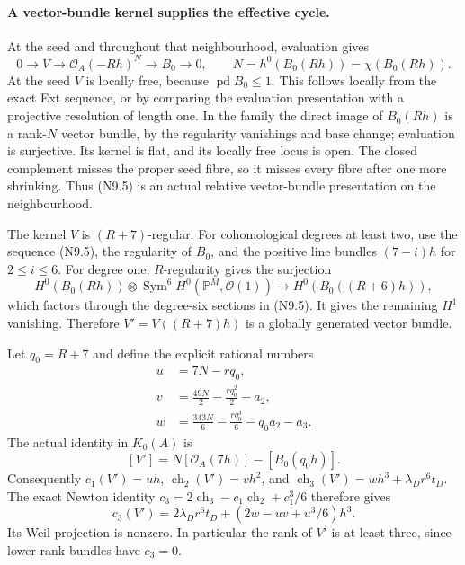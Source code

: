 \paragraph{A vector-bundle kernel supplies the effective cycle.}
At the seed and throughout that neighbourhood, evaluation gives
\[
 0\longrightarrow V\longrightarrow
    \mathcal O_A(-Rh)^N\longrightarrow B_0\longrightarrow0,
 \qquad N=h^0(B_0(Rh))=\chi(B_0(Rh)).                     \tag{N9.5}
\]
At the seed $V$ is locally free, because $\operatorname{pd}B_0\le1$.
This follows locally from the exact Ext sequence, or by comparing
the evaluation presentation with a projective resolution of
length one. In the family the direct image of $B_0(Rh)$ is a
rank-$N$ vector bundle, by the regularity vanishings and base
change; evaluation is surjective. Its kernel is flat, and its
locally free locus is open. The closed complement misses the
proper seed fibre, so it misses every fibre after one more
shrinking. Thus (N9.5) is an actual relative vector-bundle
presentation on the neighbourhood.

The kernel $V$ is $(R+7)$-regular. For cohomological degrees
at least two, use the sequence (N9.5), the regularity of $B_0$,
and the positive line bundles $(7-i)h$ for $2\le i\le6$.
For degree one, $R$-regularity gives the surjection
\[
 H^0(B_0(Rh))\otimes\operatorname{Sym}^6H^0(\mathbb P^M,\mathcal O(1))
 \longrightarrow H^0(B_0((R+6)h)),
\]
which factors through the degree-six sections in (N9.5).
It gives the remaining $H^1$ vanishing. Therefore
$V'=V((R+7)h)$ is a globally generated vector bundle.

Let $q_0=R+7$ and define the explicit rational numbers
\[
 \begin{split}
 u&=7N-rq_0,\\
 v&=\frac{49N}{2}-\frac{rq_0^2}{2}-a_2,\\
 w&=\frac{343N}{6}-\frac{rq_0^3}{6}-q_0a_2-a_3.
 \end{split}                                               \tag{N9.6}
\]
The actual identity in $K_0(A)$ is
\[
 [V']=N[\mathcal O_A(7h)]-[B_0(q_0h)].
\]
Consequently $c_1(V')=uh$, $\operatorname{ch}_2(V')=vh^2$,
and $\operatorname{ch}_3(V')=wh^3+\lambda_Dr^6t_D$.
The exact Newton identity
$c_3=2\operatorname{ch}_3-c_1\operatorname{ch}_2+c_1^3/6$
therefore gives
\[
 c_3(V')=2\lambda_Dr^6t_D+
                (2w-uv+u^3/6)h^3.                       \tag{N9.7}
\]
Its Weil projection is nonzero. In particular the rank of $V'$
is at least three, since lower-rank bundles have $c_3=0$.

